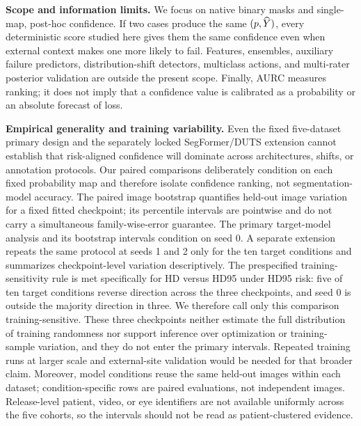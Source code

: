 \noindent\textbf{Scope and information limits.}
We focus on native binary masks and single-map, post-hoc confidence. If two cases
produce the same \((p,\widehat{Y})\), every deterministic score studied here gives them
the same confidence even when external context makes one more likely to fail.
Features, ensembles, auxiliary failure predictors, distribution-shift detectors,
multiclass actions, and multi-rater posterior validation are outside the present
scope. Finally, AURC measures ranking; it does not imply that a confidence value is
calibrated as a probability or an absolute forecast of loss.

\noindent\textbf{Empirical generality and training variability.}
Even the fixed five-dataset primary design and the separately locked
SegFormer/DUTS extension
cannot establish that risk-aligned
confidence will dominate across architectures, shifts, or annotation protocols.
Our paired comparisons deliberately condition on each fixed probability map and
therefore isolate confidence ranking, not segmentation-model accuracy. The paired
image bootstrap quantifies held-out image variation for a fixed fitted
checkpoint; its percentile intervals are pointwise and do not carry a
simultaneous family-wise-error guarantee. The primary target-model analysis and
its bootstrap intervals condition on seed 0. A separate extension repeats the
same protocol at seeds 1 and 2 only for the ten target conditions and summarizes
checkpoint-level variation descriptively. The prespecified training-sensitivity
rule is met specifically for HD versus HD95 under HD95 risk: five of ten target conditions reverse
direction across the three checkpoints, and seed 0 is outside the majority direction
in three. We therefore call only this comparison training-sensitive. These three
checkpoints neither estimate the full distribution of training randomness nor
support inference over optimization or training-sample variation, and they do not
enter the primary intervals. Repeated training runs at larger scale and external-site
validation would be needed for that broader claim. Moreover, model
conditions reuse the same held-out images within each dataset;
condition-specific rows are paired evaluations, not independent images.
Release-level patient, video, or eye identifiers are not available uniformly
across the five cohorts, so the intervals should not be read as patient-clustered
evidence.
